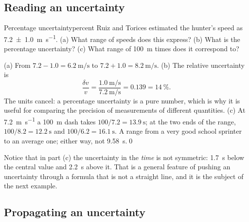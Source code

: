 \subsection{Reading an uncertainty}

\begin{example}{Percentage uncertainty}{percent}
Ruiz and Torices estimated the hunter's speed as \SI{7.2 \pm 1.0}{\metre\per\second}. (a) What range of speeds does this express? (b) What is the percentage uncertainty? (c) What range of \SI{100}{\metre} times does it correspond to?

\solution (a) From $7.2 - 1.0 = \SI{6.2}{\metre\per\second}$ to $7.2 + 1.0 = \SI{8.2}{\metre\per\second}$. (b) The relative uncertainty is
\[
\frac{\delta v}{v} = \frac{\SI{1.0}{\metre\per\second}}{\SI{7.2}{\metre\per\second}} = 0.139 = \SI{14}{\percent}.
\]
The units cancel: a percentage uncertainty is a pure number, which is why it is useful for comparing the precision of measurements of different quantities. (c) At \SI{7.2}{\metre\per\second} a \SI{100}{\metre} dash takes $100/7.2 = \SI{13.9}{\second}$; at the two ends of the range, $100/8.2 = \SI{12.2}{\second}$ and $100/6.2 = \SI{16.1}{\second}$. A range from a very good school sprinter to an average one; either way, not \SI{9.58}{\second}.\qed
\end{example}

Notice that in part (c) the uncertainty in the \emph{time} is not symmetric: \SI{1.7}{\second} below the central value and \SI{2.2}{\second} above it. That is a general feature of pushing an uncertainty through a formula that is not a straight line, and it is the subject of the next example.

\subsection{Propagating an uncertainty}

